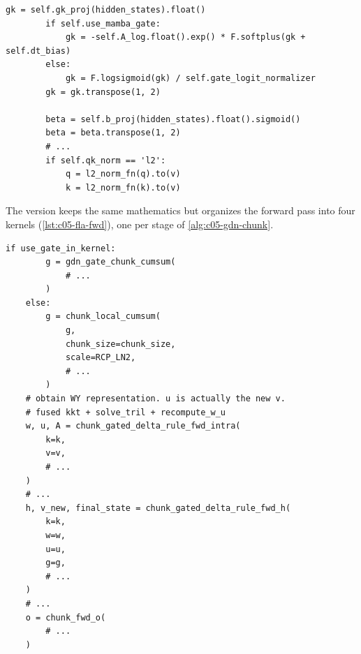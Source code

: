 \begin{lstlisting}[caption={Excerpt from \texttt{repos/\allowbreak{}NVlabs\_\_GatedDeltaNet/\allowbreak{}lit\_gpt/\allowbreak{}gated\_delta\_net.py} (gates and key normalization)},label={lst:c05-nv-gates}]
        gk = self.gk_proj(hidden_states).float()
        if self.use_mamba_gate:
            gk = -self.A_log.float().exp() * F.softplus(gk + self.dt_bias)
        else:
            gk = F.logsigmoid(gk) / self.gate_logit_normalizer
        gk = gk.transpose(1, 2)

        beta = self.b_proj(hidden_states).float().sigmoid()
        beta = beta.transpose(1, 2)
        # ...
        if self.qk_norm == 'l2':
            q = l2_norm_fn(q).to(v)
            k = l2_norm_fn(k).to(v)
\end{lstlisting}

The \fla{} version keeps the same mathematics but organizes the forward pass into four kernels
(\cref{lst:c05-fla-fwd}), one per stage of \cref{alg:c05-gdn-chunk}.

\begin{lstlisting}[caption={Excerpt from \texttt{repos/\allowbreak{}fla-org\_\_flash-linear-attention/\allowbreak{}fla/\allowbreak{}ops/\allowbreak{}gated\_delta\_rule/\allowbreak{}chunk.py}, function \texttt{chunk\_gated\_delta\_rule\_fwd}},label={lst:c05-fla-fwd}]
    if use_gate_in_kernel:
        g = gdn_gate_chunk_cumsum(
            # ...
        )
    else:
        g = chunk_local_cumsum(
            g,
            chunk_size=chunk_size,
            scale=RCP_LN2,
            # ...
        )
    # obtain WY representation. u is actually the new v.
    # fused kkt + solve_tril + recompute_w_u
    w, u, A = chunk_gated_delta_rule_fwd_intra(
        k=k,
        v=v,
        # ...
    )
    # ...
    h, v_new, final_state = chunk_gated_delta_rule_fwd_h(
        k=k,
        w=w,
        u=u,
        g=g,
        # ...
    )
    # ...
    o = chunk_fwd_o(
        # ...
    )
\end{lstlisting}

